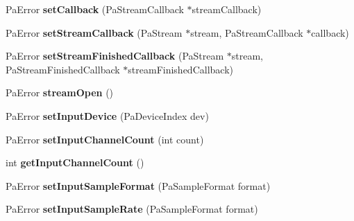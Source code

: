 \begin{DoxyCompactItemize}
\item 
\hypertarget{class_port_audio_wrap_a7b455cc4397b90c6d381c26073e51b2a}{Pa\-Error {\bfseries set\-Callback} (Pa\-Stream\-Callback $\ast$stream\-Callback)}\label{class_port_audio_wrap_a7b455cc4397b90c6d381c26073e51b2a}

\item 
\hypertarget{class_port_audio_wrap_adf02f262bcd9f85c33fea7da0e4cd841}{Pa\-Error {\bfseries set\-Stream\-Callback} (Pa\-Stream $\ast$stream, Pa\-Stream\-Callback $\ast$callback)}\label{class_port_audio_wrap_adf02f262bcd9f85c33fea7da0e4cd841}

\item 
\hypertarget{class_port_audio_wrap_a163f9ff1095444793a25f1e90442b32c}{Pa\-Error {\bfseries set\-Stream\-Finished\-Callback} (Pa\-Stream $\ast$stream, Pa\-Stream\-Finished\-Callback $\ast$stream\-Finished\-Callback)}\label{class_port_audio_wrap_a163f9ff1095444793a25f1e90442b32c}

\item 
\hypertarget{class_port_audio_wrap_ae9fa5c4e8bd989d3ff722c76a381f33f}{Pa\-Error {\bfseries stream\-Open} ()}\label{class_port_audio_wrap_ae9fa5c4e8bd989d3ff722c76a381f33f}

\item 
\hypertarget{class_port_audio_wrap_abf1e9b6f6b6e09df0b926c7995963575}{Pa\-Error {\bfseries set\-Input\-Device} (Pa\-Device\-Index dev)}\label{class_port_audio_wrap_abf1e9b6f6b6e09df0b926c7995963575}

\item 
\hypertarget{class_port_audio_wrap_ac14a25862172c41c0186add676842859}{Pa\-Error {\bfseries set\-Input\-Channel\-Count} (int count)}\label{class_port_audio_wrap_ac14a25862172c41c0186add676842859}

\item 
\hypertarget{class_port_audio_wrap_a70ee9d33e7aecf0c2844060dc7628037}{int {\bfseries get\-Input\-Channel\-Count} ()}\label{class_port_audio_wrap_a70ee9d33e7aecf0c2844060dc7628037}

\item 
\hypertarget{class_port_audio_wrap_aaa979ac038d7cea196a012484aa84623}{Pa\-Error {\bfseries set\-Input\-Sample\-Format} (Pa\-Sample\-Format format)}\label{class_port_audio_wrap_aaa979ac038d7cea196a012484aa84623}

\item 
\hypertarget{class_port_audio_wrap_af20b6e10b5e67bbc71a0ce405688d19c}{Pa\-Error {\bfseries set\-Input\-Sample\-Rate} (Pa\-Sample\-Format format)}\label{class_port_audio_wrap_af20b6e10b5e67bbc71a0ce405688d19c}


\end{DoxyCompactItemize}
